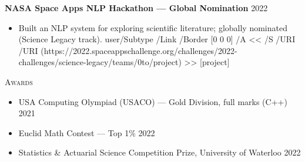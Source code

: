 \documentclass[10pt]{article}
\newcommand{\href}[2]{%
  \leavevmode
  \pdfstartlink user{/Subtype /Link /Border [0 0 0] /A << /S /URI /URI (#1) >>}%
  \textcolor{accent}{#2}%
  \pdfendlink}
\newcommand{\cvsection}[1]{%
  \par\vspace{0.75em}%
  {\noindent\normalsize\scshape\color{accent}#1\par}%
  \vspace{-0.6em}\noindent{\color{rulegray}\rule{\textwidth}{0.6pt}}\par
  \vspace{0.2em}%
}
\newcommand{\entry}[2]{\noindent\textbf{#1} \hfill {\small\color{mutedgray}#2}\par}
\begin{document}
\vspace{0.3em}
\entry{NASA Space Apps NLP Hackathon --- Global Nomination}{2022}
\begin{itemize}
  \item Built an NLP system for exploring scientific literature; globally nominated (Science Legacy track). \href{https://2022.spaceappschallenge.org/challenges/2022-challenges/science-legacy/teams/0to/project}{[project]}
\end{itemize}

\cvsection{Awards}
\begin{itemize}
  \item USA Computing Olympiad (USACO) --- Gold Division, full marks (C++) \hfill {\small\color{mutedgray}2021}
  \item Euclid Math Contest --- Top 1\% \hfill {\small\color{mutedgray}2022}
  \item Statistics \& Actuarial Science Competition Prize, University of Waterloo \hfill {\small\color{mutedgray}2022}
\end{itemize}
\end{document}
